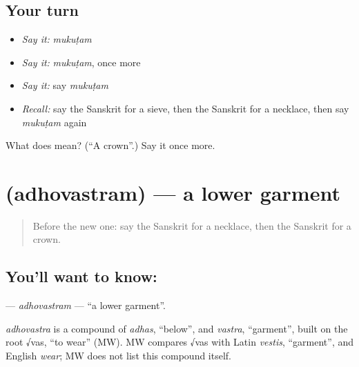 \subsection*{Your turn}
\begin{itemize}
\raggedright
  \item \emph{Say it:} \emph{mukuṭam}
  \item \emph{Say it:} \emph{mukuṭam}, once more
  \item \emph{Say it:} say \emph{mukuṭam}
  \item \emph{Recall:} say the Sanskrit for a sieve, then the Sanskrit for a necklace, then say \emph{mukuṭam} again
\end{itemize}

\begin{tcolorbox}[breakable,colback=teal!4,colframe=teal!35!black,title={Before you move on}]
What does  mean? (\textquotedblleft{}A crown\textquotedblright{}.) Say it once more.
\end{tcolorbox}
\section[\texorpdfstring{\sk{अधोवस्त्रम्} (adhovastram)}{अधोवस्त्रम् (adhovastram)}]{ (adhovastram) — a lower garment}

\label{lesson:SA-C192-adhovastram}



\begin{quote}
Before the new one: say the Sanskrit for a necklace, then the Sanskrit for a crown.
\end{quote}

\subsection*{You'll want to know: }
\textbf{} — \emph{adhovastram} — \textquotedblleft{}a lower garment\textquotedblright{}.

\begin{cousinweb}
\emph{adhovastra} is a compound of \emph{adhas}, \textquotedblleft{}below\textquotedblright{}, and \emph{vastra}, \textquotedblleft{}garment\textquotedblright{}, built on the root √vas, \textquotedblleft{}to wear\textquotedblright{} (MW). MW compares √vas with Latin \emph{vestis}, \textquotedblleft{}garment\textquotedblright{}, and English \emph{wear}; MW does not list this compound itself.
\end{cousinweb}

